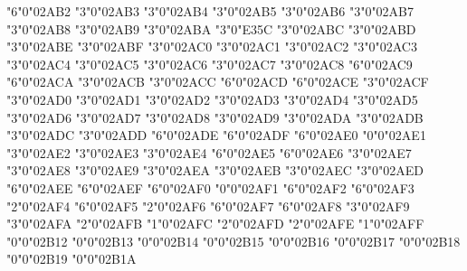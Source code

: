 \mchardef\succneq"6"0"02AB2
\mchardef\preceqq"3"0"02AB3
\mchardef\succeqq"3"0"02AB4
\mchardef\precneqq"3"0"02AB5
\mchardef\succneqq"3"0"02AB6
\mchardef\precapprox"3"0"02AB7
\mchardef\succapprox"3"0"02AB8
\mchardef\precnapprox"3"0"02AB9
\mchardef\succnapprox"3"0"02ABA
\mchardef\Prec"3"0"E35C
\mchardef\Succ"3"0"02ABC
\mchardef\subsetdot"3"0"02ABD
\mchardef\supsetdot"3"0"02ABE
\mchardef\subsetplus"3"0"02ABF
\mchardef\supsetplus"3"0"02AC0
\mchardef\submult"3"0"02AC1
\mchardef\supmult"3"0"02AC2
\mchardef\subedot"3"0"02AC3
\mchardef\supedot"3"0"02AC4
\mchardef\subseteqq"3"0"02AC5
\mchardef\supseteqq"3"0"02AC6
\mchardef\subsim"3"0"02AC7
\mchardef\supsim"3"0"02AC8
\mchardef\subsetapprox"6"0"02AC9
\mchardef\supsetapprox"6"0"02ACA
\mchardef\subsetneqq"3"0"02ACB
\mchardef\supsetneqq"3"0"02ACC
\mchardef\lsqhook"6"0"02ACD
\mchardef\rsqhook"6"0"02ACE
\mchardef\csub"3"0"02ACF
\mchardef\csup"3"0"02AD0
\mchardef\csube"3"0"02AD1
\mchardef\csupe"3"0"02AD2
\mchardef\subsup"3"0"02AD3
\mchardef\supsub"3"0"02AD4
\mchardef\subsub"3"0"02AD5
\mchardef\supsup"3"0"02AD6
\mchardef\suphsub"3"0"02AD7
\mchardef\supdsub"3"0"02AD8
\mchardef\forkv"3"0"02AD9
\mchardef\topfork"3"0"02ADA
\mchardef\mlcp"3"0"02ADB
\mchardef\forks"3"0"02ADC
\mchardef\forksnot"3"0"02ADD
\mchardef\shortlefttack"6"0"02ADE
\mchardef\shortdowntack"6"0"02ADF
\mchardef\shortuptack"6"0"02AE0
\mchardef\perps"0"0"02AE1
\mchardef\vDdash"3"0"02AE2
\mchardef\dashV"3"0"02AE3
\mchardef\Dashv"3"0"02AE4
\mchardef\DashV"6"0"02AE5
\mchardef\varVdash"6"0"02AE6
\mchardef\Barv"3"0"02AE7
\mchardef\vBar"3"0"02AE8
\mchardef\vBarv"3"0"02AE9
\mchardef\barV"3"0"02AEA
\mchardef\Vbar"3"0"02AEB
\mchardef\Not"3"0"02AEC
\mchardef\bNot"3"0"02AED
\mchardef\revnmid"6"0"02AEE
\mchardef\cirmid"6"0"02AEF
\mchardef\midcir"6"0"02AF0
\mchardef\topcir"0"0"02AF1
\mchardef\nhpar"6"0"02AF2
\mchardef\parsim"6"0"02AF3
\mchardef\interleave"2"0"02AF4
\mchardef\nhVvert"6"0"02AF5
\mchardef\threedotcolon"2"0"02AF6
\mchardef\lllnest"6"0"02AF7
\mchardef\gggnest"6"0"02AF8
\mchardef\leqqslant"3"0"02AF9
\mchardef\geqqslant"3"0"02AFA
\mchardef\trslash"2"0"02AFB
\mchardef\biginterleave"1"0"02AFC
\mchardef\sslash"2"0"02AFD
\let\dslash\sslash
\mchardef\talloblong"2"0"02AFE
\mchardef\bigtalloblong"1"0"02AFF
\mchardef\squaretopblack"0"0"02B12
\mchardef\squarebotblack"0"0"02B13
\mchardef\squareurblack"0"0"02B14
\let\semaphorer\squareurblack
\mchardef\squarellblack"0"0"02B15
\let\semaphorel\squarellblack
\mchardef\diamondleftblack"0"0"02B16
\mchardef\diamondrightblack"0"0"02B17
\mchardef\diamondtopblack"0"0"02B18
\mchardef\diamondbotblack"0"0"02B19
\mchardef\dottedsquare"0"0"02B1A
